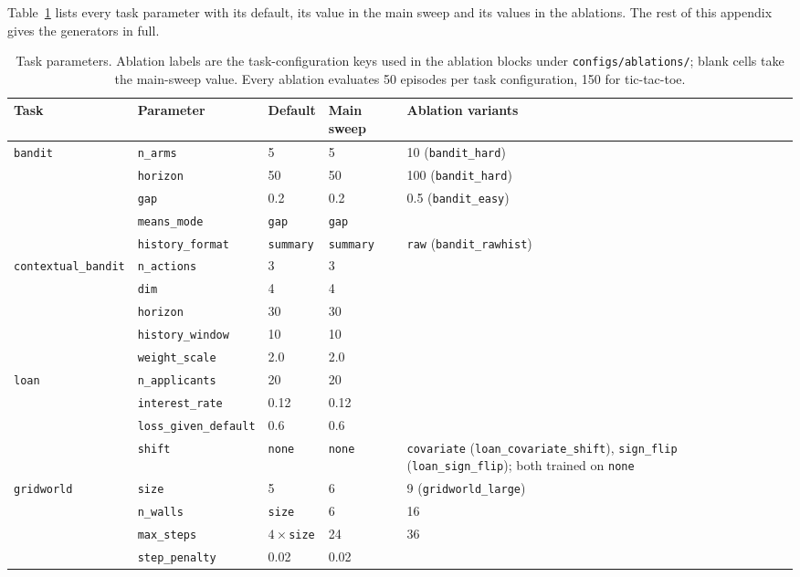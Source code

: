 Table~\ref{tab:envparams} lists every task parameter with its default, its value in the main sweep and its values in the ablations. The rest of this appendix gives the generators in full.

\begin{table}[h]
\centering\small
\caption{Task parameters. Ablation labels are the task-configuration keys used in the ablation blocks under \texttt{configs/ablations/}; blank cells take the main-sweep value. Every ablation evaluates 50 episodes per task configuration, 150 for tic-tac-toe.}
\label{tab:envparams}
\begin{tabularx}{\linewidth}{@{}l l l l X@{}}
\toprule
Task & Parameter & Default & Main sweep & Ablation variants\\
\midrule
\texttt{bandit} & \texttt{n\_arms} & 5 & 5 & 10 (\texttt{bandit\_hard})\\
 & \texttt{horizon} & 50 & 50 & 100 (\texttt{bandit\_hard})\\
 & \texttt{gap} & 0.2 & 0.2 & 0.5 (\texttt{bandit\_easy})\\
 & \texttt{means\_mode} & \texttt{gap} & \texttt{gap} & \\
 & \texttt{history\_format} & \texttt{summary} & \texttt{summary} & \texttt{raw} (\texttt{bandit\_rawhist})\\
\midrule
\texttt{contextual\_bandit} & \texttt{n\_actions} & 3 & 3 & \\
 & \texttt{dim} & 4 & 4 & \\
 & \texttt{horizon} & 30 & 30 & \\
 & \texttt{history\_window} & 10 & 10 & \\
 & \texttt{weight\_scale} & 2.0 & 2.0 & \\
\midrule
\texttt{loan} & \texttt{n\_applicants} & 20 & 20 & \\
 & \texttt{interest\_rate} & 0.12 & 0.12 & \\
 & \texttt{loss\_given\_default} & 0.6 & 0.6 & \\
 & \texttt{shift} & \texttt{none} & \texttt{none} & \texttt{covariate} (\texttt{loan\_covariate\_shift}), \texttt{sign\_flip} (\texttt{loan\_sign\_flip}); both trained on \texttt{none}\\
\midrule
\texttt{gridworld} & \texttt{size} & 5 & 6 & 9 (\texttt{gridworld\_large})\\
 & \texttt{n\_walls} & \texttt{size} & 6 & 16\\
 & \texttt{max\_steps} & $4\times$\texttt{size} & 24 & 36\\
 & \texttt{step\_penalty} & 0.02 & 0.02 & \\

\end{tabularx}
\end{table}
